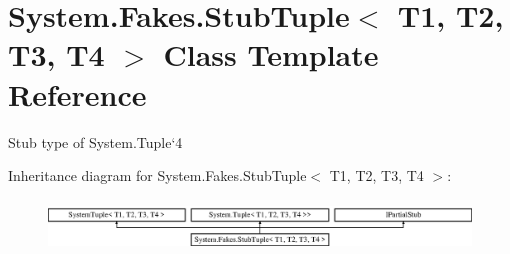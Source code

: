 \hypertarget{class_system_1_1_fakes_1_1_stub_tuple_3_01_t1_00_01_t2_00_01_t3_00_01_t4_01_4}{\section{System.\-Fakes.\-Stub\-Tuple$<$ T1, T2, T3, T4 $>$ Class Template Reference}
\label{class_system_1_1_fakes_1_1_stub_tuple_3_01_t1_00_01_t2_00_01_t3_00_01_t4_01_4}
}


Stub type of System.\-Tuple`4 


Inheritance diagram for System.\-Fakes.\-Stub\-Tuple$<$ T1, T2, T3, T4 $>$\-:\begin{figure}[H]
\begin{center}
\leavevmode
\includegraphics[height=1.408805cm]{class_system_1_1_fakes_1_1_stub_tuple_3_01_t1_00_01_t2_00_01_t3_00_01_t4_01_4}
\end{center}
\end{figure}
